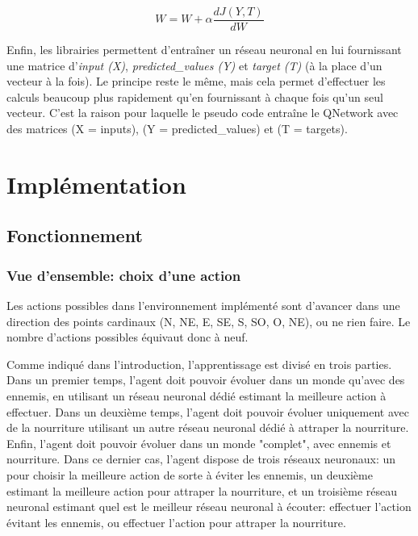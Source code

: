 \documentclass[11pt,a4paper]{report}
\begin{document}
  $$W = W + \alpha \frac{dJ(Y,T)}{dW}$$
  
  \par Enfin, les librairies permettent d’entraîner un réseau neuronal en lui fournissant une matrice d'\textit{input (X)}, \textit{predicted\_values (Y)} et \textit{target (T)} (à la place d'un vecteur à la fois). Le principe reste le même, mais cela permet d'effectuer les calculs beaucoup plus rapidement qu'en fournissant à chaque fois qu'un seul vecteur. C'est la raison pour laquelle le pseudo code entraîne le QNetwork avec des matrices (X = inputs), (Y = predicted\_values) et (T = targets). 
  
  \chapter{Implémentation}
  
  \section{Fonctionnement}
  
  \subsection{Vue d'ensemble: choix d'une action}
  
  \par Les actions possibles dans l'environnement implémenté sont d'avancer dans une direction des points cardinaux (N, NE, E, SE, S, SO, O, NE), ou ne rien faire. Le nombre d'actions possibles équivaut donc à neuf. 

  \par Comme indiqué dans l'introduction, l'apprentissage est divisé en trois parties. Dans un premier temps, l'agent doit pouvoir évoluer dans un monde qu'avec des ennemis, en utilisant un réseau neuronal dédié estimant la meilleure action à effectuer. Dans un deuxième temps, l'agent doit pouvoir évoluer uniquement avec de la nourriture utilisant un autre réseau neuronal dédié à attraper la nourriture. Enfin, l'agent doit pouvoir évoluer dans un monde "complet", avec ennemis et nourriture. Dans ce dernier cas, l'agent dispose de trois réseaux neuronaux: un pour choisir la meilleure action de sorte à éviter les ennemis, un deuxième estimant la meilleure action pour attraper la nourriture, et un troisième réseau neuronal estimant quel est le meilleur réseau neuronal à écouter: effectuer l'action évitant les ennemis, ou effectuer l'action pour attraper la nourriture. 
  
\end{document}
